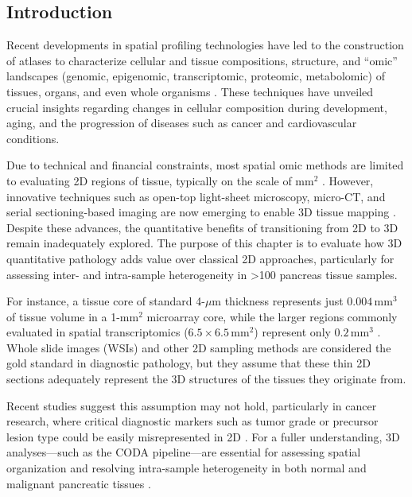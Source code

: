 \begin{refsection}
   
    \section{Introduction}
    Recent developments in spatial profiling technologies have led to the construction of atlases to characterize cellular and tissue compositions, structure, and “omic” landscapes (genomic, epigenomic, transcriptomic, proteomic, metabolomic) of tissues, organs, and even whole organisms \cite{Liu2020High}. These techniques have unveiled crucial insights regarding changes in cellular composition during development, aging, and the progression of diseases such as cancer and cardiovascular conditions. 

    Due to technical and financial constraints, most spatial omic methods are limited to evaluating 2D regions of tissue, typically on the scale of \( \text{mm}^2 \) \cite{ref10, ref14}. However, innovative techniques such as open-top light-sheet microscopy, micro-CT, and serial sectioning-based imaging are now emerging to enable 3D tissue mapping \cite{ref15, ref18}. Despite these advances, the quantitative benefits of transitioning from 2D to 3D remain inadequately explored. The purpose of this chapter is to evaluate how 3D quantitative pathology adds value over classical 2D approaches, particularly for assessing inter- and intra-sample heterogeneity in >100 pancreas tissue samples.

    For instance, a tissue core of standard 4-\( \mu \text{m} \) thickness represents just \( 0.004 \, \text{mm}^3 \) of tissue volume in a 1-\( \text{mm}^2 \) microarray core, while the larger regions commonly evaluated in spatial transcriptomics (\( 6.5 \times 6.5 \, \text{mm}^2 \)) represent only \( 0.2 \, \text{mm}^3 \) \cite{ref13}. Whole slide images (WSIs) and other 2D sampling methods are considered the gold standard in diagnostic pathology, but they assume that these thin 2D sections adequately represent the 3D structures of the tissues they originate from.

    Recent studies suggest this assumption may not hold, particularly in cancer research, where critical diagnostic markers such as tumor grade or precursor lesion type could be easily misrepresented in 2D \cite{ref21, ref25}. For a fuller understanding, 3D analyses—such as the CODA pipeline—are essential for assessing spatial organization and resolving intra-sample heterogeneity in both normal and malignant pancreatic tissues \cite{ref28}.


\end{refsection}
